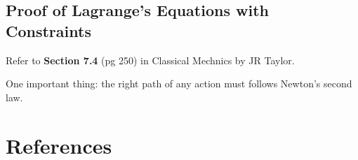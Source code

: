 \documentclass[a4paper]{article}
\numberwithin{equation}{subsection}
\begin{document}
\subsection{Proof of Lagrange's Equations with Constraints}
Refer to \textbf{Section 7.4} (pg 250) in Classical Mechnics by JR Taylor.

One important thing: the right path of any action must follows Newton's second law.













\newpage
\section*{References}
%
\printbibliography[heading = none]
\end{document}
